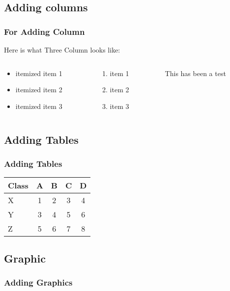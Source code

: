 \documentclass{beamer}
\begin{document}
\subsection{Adding columns}
\frame
{
\frametitle{For Adding Column}
Here is what Three Column looks like:
\begin{columns}
\begin{column}{0.45\textwidth}
\begin{itemize}
\item itemized item 1
\item itemized item 2
\item itemized item 3
\end{itemize}
\end{column}

\begin{column}{0.25\textwidth}
\begin{enumerate}
\item item 1
\item item 2
\item item 3
\end{enumerate}
\end{column}

\begin{column}{0.45\textwidth}
This has been a test
\end{column}
\end{columns}
}
\subsection{Adding Tables}
\frame
{
\frametitle{Adding Tables}
\begin{tabular}{lcccc}
Class & A & B & C & D \\\hline
X & 1 & 2 & 3 & 4 \\
Y & 3 & 4 & 5 & 6 \pause\\
Z & 5 & 6	& 7	& 8
\end{tabular}
}
\subsection{Graphic}
\frame
{
\frametitle{Adding Graphics}
\begin{figure}
\end{figure}
}
\end{document}
